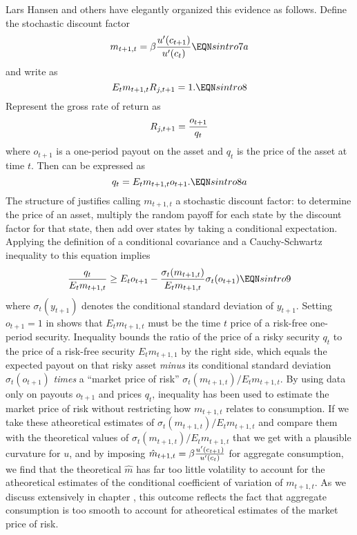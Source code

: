 Lars Hansen and others have elegantly organized this evidence as follows.
Define the stochastic discount factor $$m_{t+1,t}  = \beta {u'(c_{t+1} )
\over u'(c_t)} \EQN sintro7a $$
 and write  as
  $$ E_t m_{t+1,t} R_{j,t+1}  = 1 . \EQN sintro8 $$
Represent the gross rate of return as
$$ R_{j,t+1} = {o_{t+1} \over q_t } $$
where $o_{t+1}$ is a one-period payout on the asset and $q_t$ is
the price of the asset at time $t$.  Then  can be expressed
as
$$ q_t = E_t m_{t+1,t} o_{t+1}. \EQN sintro8a $$
The structure of  justifies calling $m_{t+1,t}$
a stochastic discount factor: to determine the price of an
asset, multiply the random payoff for each state by the discount factor
for that state, then add over states by taking a conditional expectation.
Applying the definition of a conditional covariance and a Cauchy-Schwartz
inequality to this equation implies
$$ {q_t \over E_t m_{t+1,t}} \geq E_t o_{t+1} -
  {\sigma_t(m_{t+1,t}) \over  E_t m_{t+1,t}} \sigma_t(o_{t+1}) \EQN sintro9 $$
where $\sigma_t(y_{t+1})$ denotes  the conditional standard deviation of
$y_{t+1}$.
Setting $o_{t+1}=1$ in  shows that $E_t m_{t+1,t}$ must be
the time $t$
price of a risk-free one-period security.   Inequality
 bounds the ratio of the price of a risky security $q_t$
to the price of a risk-free security $E_t m_{t+1,1}$ by the right side,
which equals the expected
payout on that risky asset {\it minus\/} its conditional
standard deviation $\sigma_t(o_{t+1})$ {\it times\/}
 a ``market price of risk''
 ${\sigma_t(m_{t+1,t}) /  E_t
  m_{t+1,t}}$.
By using data only on payouts $o_{t+1}$ and prices $q_t$,
inequality  has been used to estimate the market price
of risk without restricting how  $m_{t+1,t}$  relates
to consumption.
If we take these atheoretical  estimates of
 ${\sigma_t(m_{t+1,t}) /  E_t
  m_{t+1,t}}$
 and compare them with the theoretical
values of
 ${\sigma_t(m_{t+1,t}) /  E_t
  m_{t+1,t}}$ that we get
with a
plausible curvature for $u$, and
by imposing $\hat m_{t+1,t} = \beta {u'(c_{t+1})\over u'(c_t)}$ for aggregate
consumption,
 we find that the theoretical
$\hat m$ has far too little volatility to account for the
atheoretical estimates of the conditional coefficient of variation
of $m_{t+1,t}$.    As we discuss extensively in chapter ,
this outcome reflects the fact that aggregate consumption is too
smooth to account for atheoretical estimates of the market price of risk.


